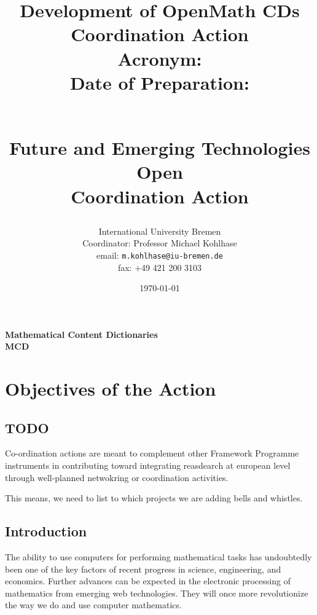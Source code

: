 \documentclass{euproposal}
\begin{document}
\setcounter{part}{2}%


\title{Development of OpenMath CDs Coordination Action\\
  Acronym: \cdca\\
  Date of Preparation: \date{\today} \\
  Future and Emerging Technologies Open\\
  Coordination Action}
\author{International University  Bremen\\
  Coordinator: Professor Michael Kohlhase\\
  email: \texttt{m.kohlhase@iu-bremen.de}\\
  fax: +49 421 200 3103}


\titlepage 
\maketitle

\setcounter{tocdepth}{1}\tableofcontents\newpage
\begin{center}\bf
Mathematical Content Dictionaries\\
MCD
\end{center}
\newpage\setcounter{chapter}{0}

\chapter{Objectives of the Action}


\begin{quote}\sf
\end{quote}

\section*{TODO}
Co-ordination actions are meant to complement other Framework Programme
instruments in contributing toward integrating reasdearch at european level
through well-planned netwokring or coordination activities.

This means, we need to list to which projects we are adding bells and whistles.

\section{Introduction}
The ability to use computers for performing mathematical tasks has undoubtedly
been one of the key factors of recent progress in science, engineering,
and economics. 
Further
advances can be
expected in the electronic processing of mathematics
from emerging web technologies.
They will once
more revolutionize the way we do and use computer mathematics.
\end{document}
